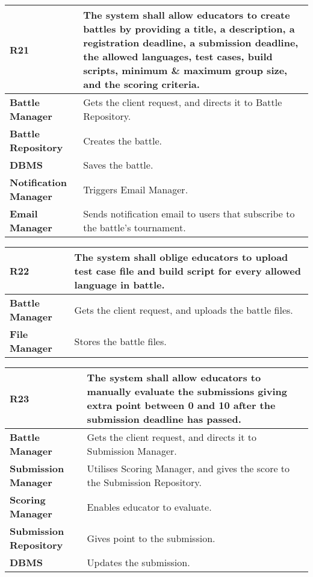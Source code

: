 \begin{table}[h!]
  \centering
  \begin{tabular}{lp{12cm}}
    \hline
    \textbf{R21} & The system shall allow educators to create battles by providing a title, a description, a registration deadline, a submission deadline, the allowed languages, test cases, build scripts, minimum \& maximum group size, and the scoring criteria. \\
    \hline
    \hline
    \textbf{Battle Manager} & Gets the client request, and directs it to Battle Repository. \\
    \textbf{Battle Repository} & Creates the battle.\\
    \textbf{DBMS} & Saves the battle. \\
    \textbf{Notification Manager} &  Triggers Email Manager.\\
    \textbf{Email Manager} &  Sends notification email to users that subscribe to the battle's tournament.\\
    \hline
  \end{tabular}
\end{table}


\begin{table}[h!]
  \centering
  \begin{tabular}{lp{12cm}}
    \hline
    \textbf{R22} & The system shall oblige educators to upload test case file and build script for every allowed language in battle. \\
    \hline
    \hline
    \textbf{Battle Manager} & Gets the client request, and uploads the battle files. \\
    \textbf{File Manager} & Stores the battle files. \\
    \hline
  \end{tabular}
\end{table}

\begin{table}[h!]
  \centering
  \begin{tabular}{lp{12cm}}
    \hline
    \textbf{R23} & The system shall allow educators to manually evaluate the submissions giving extra point between 0 and 10 after the submission deadline has passed. \\
    \hline
    \hline
    \textbf{Battle Manager} & Gets the client request, and directs it to Submission Manager. \\
    \textbf{Submission Manager} & Utilises Scoring Manager, and gives the score to the Submission Repository.\\
    \textbf{Scoring Manager} & Enables educator to evaluate. \\
     \textbf{Submission Repository} & Gives point to the submission.\\
     \textbf{DBMS} & Updates the submission. \\
    \hline
  \end{tabular}
\end{table}

